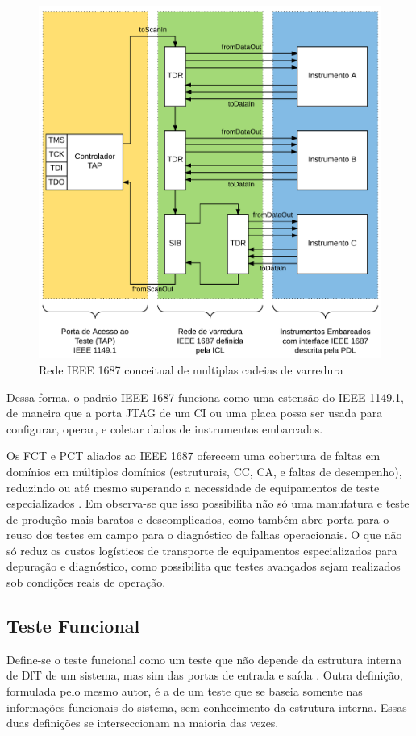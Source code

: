\begin{figure}
    \centering
        \includegraphics[width=1.0\linewidth]{fig/IEEE1687}
            \caption{Rede IEEE 1687 conceitual de multiplas cadeias de varredura}
            \label{fig:ieee1687}
\end{figure}

Dessa forma, o padrão IEEE 1687 funciona como uma estensão do IEEE 1149.1, de maneira que a porta JTAG de um CI ou uma placa possa ser usada para configurar, operar, e coletar dados de instrumentos embarcados.

Os FCT e PCT aliados ao IEEE 1687 oferecem uma cobertura de faltas em domínios em múltiplos domínios (estruturais, CC, CA, e faltas de desempenho), reduzindo ou até mesmo superando a necessidade de equipamentos de teste especializados \citep{thomaswenzel2013}. Em \citet{jutman2014high} observa-se que isso possibilita não só uma manufatura e teste de produção mais baratos e descomplicados, como também abre porta para o reuso dos testes em campo para o diagnóstico de falhas operacionais. O que não só reduz os custos logísticos de transporte de equipamentos especializados para depuração e diagnóstico, como possibilita que testes avançados sejam realizados sob condições reais de operação. 

\subsection{Teste Funcional}
Define-se o teste funcional como um teste que não depende da estrutura interna de DfT de um sistema, mas sim das portas de entrada e saída \citep{jutman2014high}. Outra definição, formulada pelo mesmo autor, é a de um teste que se baseia somente nas informações funcionais do sistema, sem conhecimento da estrutura interna. Essas duas definições se interseccionam na maioria das vezes.

